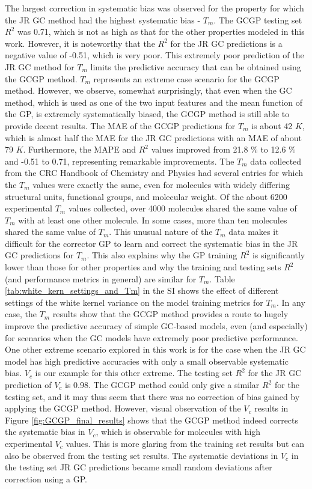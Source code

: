 \documentclass[journal=jacsat,manuscript=article, ]{achemso}
\begin{document}
 
The largest correction in systematic bias was observed for the property for which the JR GC method had the highest systematic bias - $T_m$. 
The GCGP testing set $R^2$ was 0.71, which is not as high as that for the other properties modeled in this work. However, it is noteworthy that the $R^2$ for the JR GC predictions is a negative value of -0.51, which is very poor. 
This extremely poor prediction of the JR GC method for $T_m$ limits the predictive accuracy that can be obtained using the GCGP method. $T_m$ represents an extreme case scenario for the GCGP method. 
However, we observe, somewhat surprisingly, that even when the GC method, which is used as one of the two input features and the mean function of the GP, is extremely systematically biased, the GCGP method is still able to provide decent results. 
The MAE of the GCGP predictions for $T_m$ is about 42 $K$, which is almost half the MAE for the JR GC predictions with an MAE of about 79 $K$. 
Furthermore, the MAPE and $R^2$ values improved from 21.8 \% to 12.6 \% and -0.51 to 0.71, representing remarkable improvements. The $T_m$ data collected from the CRC Handbook of Chemistry and Physics had several entries for which the $T_m$ values were exactly the same, even for molecules with widely differing structural units, functional groups, and molecular weight. 
Of the about 6200 experimental $T_m$  values collected, over 4000 molecules shared the same value of $T_m$ with at least one other molecule. 
In some cases, more than ten molecules shared the same value of $T_m$. This unusual nature of the $T_m$ data makes it difficult for the corrector GP to learn and correct the systematic bias in the JR GC predictions for $T_m$. 
This also explains why the GP training $R^2$ is significantly lower than those for other properties and why the training and testing sets $R^2$ (and performance metrics in general) are similar for $T_m$. 
Table \ref{tab:white_kern_settings_and_Tm} in the SI shows the effect of different settings of the white kernel variance on the model training metrics for $T_m$. In any case, the $T_m$ results show that the GCGP method provides a route to hugely improve the predictive accuracy of simple GC-based models, even (and especially) for scenarios when the GC models have extremely poor predictive performance. One other extreme scenario explored in this work is for the case when the JR GC model has high predictive accuracies with only a small observable systematic bias. $V_c$ is our example for this other extreme. The testing set $R^2$ for the JR GC prediction of $V_c$ is 0.98. The GCGP method could only give a similar $R^2$ for the testing set, and it may thus seem that there was no correction of bias gained by applying the GCGP method. However, visual observation of the $V_c$ results in Figure \ref{fig:GCGP_final_results} shows that the GCGP method indeed corrects the systematic bias in $V_c$, which is observable for molecules with high experimental $V_c$ values. This is more glaring from the training set results but can also be observed from the testing set results. The systematic deviations in $V_c$ in the testing set JR GC predictions became small random deviations after correction using a GP.
\end{document}
